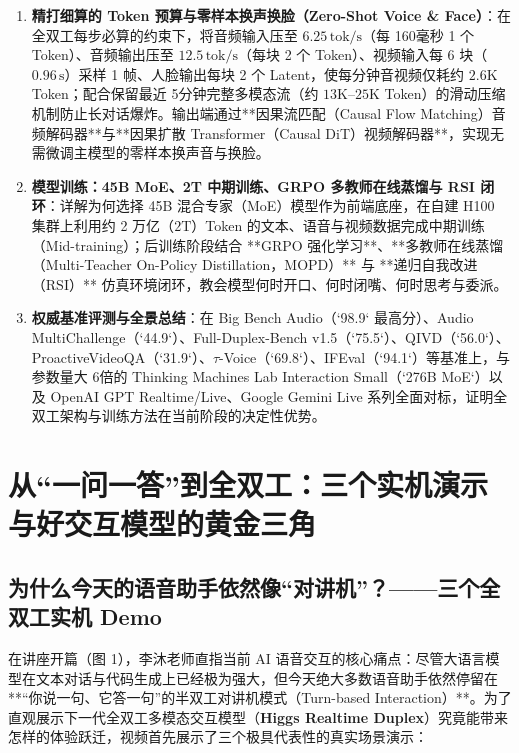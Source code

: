 \documentclass[a4paper]{article}
\begin{document}
\begin{enumerate}
    \item \textbf{精打细算的 Token 预算与零样本换声换脸（Zero-Shot Voice \& Face）}：在全双工每步必算的约束下，将音频输入压至 $6.25\,\mathrm{tok/s}$（每 160毫秒 1 个 Token）、音频输出压至 $12.5\,\mathrm{tok/s}$（每块 2 个 Token）、视频输入每 6 块（$0.96\,\mathrm{s}$）采样 1 帧、人脸输出每块 2 个 Latent，使每分钟音视频仅耗约 $2.6\mathrm{K}$ Token；配合保留最近 5分钟完整多模态流（约 $13\mathrm{K}\text{--}25\mathrm{K}$ Token）的滑动压缩机制防止长对话爆炸。输出端通过**因果流匹配（Causal Flow Matching）音频解码器**与**因果扩散 Transformer（Causal DiT）视频解码器**，实现无需微调主模型的零样本换声音与换脸。
    \item \textbf{模型训练：45B MoE、2T 中期训练、GRPO 多教师在线蒸馏与 RSI 闭环}：详解为何选择 45B 混合专家（MoE）模型作为前端底座，在自建 H100 集群上利用约 2 万亿（$2\mathrm{T}$）Token 的文本、语音与视频数据完成中期训练（Mid-training）；后训练阶段结合 **GRPO 强化学习**、**多教师在线蒸馏（Multi-Teacher On-Policy Distillation，MOPD）** 与 **递归自我改进（RSI）** 仿真环境闭环，教会模型何时开口、何时闭嘴、何时思考与委派。
    \item \textbf{权威基准评测与全景总结}：在 Big Bench Audio（`98.9` 最高分）、Audio MultiChallenge（`44.9`）、Full-Duplex-Bench v1.5（`75.5`）、QIVD（`56.0`）、ProactiveVideoQA（`31.9`）、$\tau$-Voice（`69.8`）、IFEval（`94.1`）等基准上，与参数量大 6倍的 Thinking Machines Lab Interaction Small（`276B MoE`）以及 OpenAI GPT Realtime/Live、Google Gemini Live 系列全面对标，证明全双工架构与训练方法在当前阶段的决定性优势。
\end{enumerate}

\newpage
\tableofcontents
\newpage

\section{从“一问一答”到全双工：三个实机演示与好交互模型的黄金三角}

\subsection{为什么今天的语音助手依然像“对讲机”？——三个全双工实机 Demo}

在讲座开篇（图 1），李沐老师直指当前 AI 语音交互的核心痛点：尽管大语言模型在文本对话与代码生成上已经极为强大，但今天绝大多数语音助手依然停留在**“你说一句、它答一句”的半双工对讲机模式（Turn-based Interaction）**。为了直观展示下一代全双工多模态交互模型（\textbf{Higgs Realtime Duplex}）究竟能带来怎样的体验跃迁，视频首先展示了三个极具代表性的真实场景演示：
\end{document}
